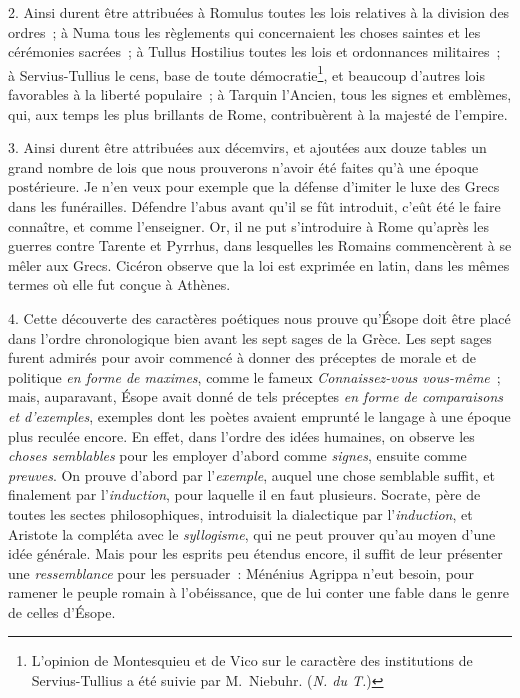 \documentclass[french,twoside]{book} %
\begin{document}
 2. Ainsi durent être attribuées à Romulus toutes les lois relatives à la division des ordres ; à Numa tous les règlements qui concernaient les choses saintes et les cérémonies sacrées ; à Tullus Hostilius toutes les lois et ordonnances militaires ; à Servius-Tullius le cens, base de toute démocratie\footnote{L’opinion de Montesquieu et de Vico sur le caractère des institutions de Servius-Tullius a été suivie par M. Niebuhr. ({\itshape N. du T.})}, et beaucoup d’autres lois favorables à la liberté populaire ; à Tarquin l’Ancien, tous les signes et emblèmes, qui, aux temps les plus brillants de Rome, contribuèrent à la majesté de l’empire.\par
3. Ainsi durent être attribuées aux décemvirs, et ajoutées aux douze tables un grand nombre de lois que nous prouverons n’avoir été faites qu’à une époque postérieure. Je n’en veux pour exemple que la défense d’imiter le luxe des Grecs dans les funérailles. Défendre l’abus avant qu’il se fût introduit, c’eût été le faire connaître, et comme l’enseigner. Or, il ne put s’introduire à Rome qu’après les  guerres contre Tarente et Pyrrhus, dans lesquelles les Romains commencèrent à se mêler aux Grecs. Cicéron observe que la loi est exprimée en latin, dans les mêmes termes où elle fut conçue à Athènes.\par
4. Cette découverte des caractères poétiques nous prouve qu’Ésope doit être placé dans l’ordre chronologique bien avant les sept sages de la Grèce. Les sept sages furent admirés pour avoir commencé à donner des préceptes de morale et de politique {\itshape en forme de maximes}, comme le fameux {\itshape Connaissez-vous vous-même} ; mais, auparavant, Ésope avait donné de tels préceptes {\itshape en forme de comparaisons et d’exemples}, exemples dont les poètes avaient emprunté le langage à une époque plus reculée encore. En effet, dans l’ordre des idées humaines, on observe les {\itshape choses semblables} pour les employer d’abord comme {\itshape signes}, ensuite comme {\itshape preuves}. On prouve d’abord par l’{\itshape exemple}, auquel une chose semblable suffit, et finalement par l’{\itshape induction}, pour laquelle il en faut plusieurs. Socrate, père de toutes les sectes philosophiques, introduisit la dialectique par l’{\itshape induction}, et Aristote la compléta avec le {\itshape syllogisme}, qui ne peut prouver qu’au moyen d’une idée générale. Mais pour les esprits peu étendus encore, il suffit de leur présenter une {\itshape ressemblance} pour les persuader : Ménénius Agrippa n’eut besoin, pour ramener le peuple romain à l’obéissance, que de lui conter une fable dans le genre de celles d’Ésope.\par
\end{document}
